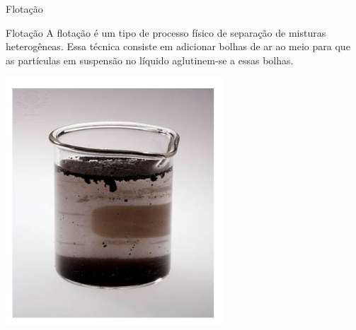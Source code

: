 \documentclass{beamer}
\begin{document}
\begin{frame}[label={sec:org0d48604}]{Flotação}
\begin{block}{Flotação}
A flotação é um tipo de processo físico de separação de misturas heterogêneas. Essa técnica consiste em adicionar bolhas de ar ao meio para que as partículas em suspensão no líquido aglutinem-se a essas bolhas.

\begin{center}
\includegraphics[scale=0.4]{../img/flotacao.png}
\end{center}
\end{block}
\end{frame}
\end{document}
